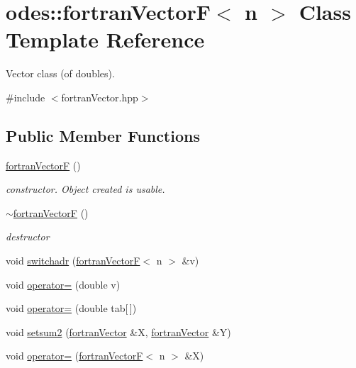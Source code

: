\hypertarget{classodes_1_1fortranVectorF}{\section{odes\-:\-:fortran\-Vector\-F$<$ n $>$ Class Template Reference}
\label{classodes_1_1fortranVectorF}
}


Vector class (of doubles).  




{\ttfamily \#include $<$fortran\-Vector.\-hpp$>$}

\subsection*{Public Member Functions}
\begin{DoxyCompactItemize}
\item 
\hyperlink{classodes_1_1fortranVectorF_a446528db3c1fe4b61dcfac9402b8c619}{fortran\-Vector\-F} ()
\begin{DoxyCompactList}\small\item\em constructor. Object created is usable. \end{DoxyCompactList}\item 
\hyperlink{classodes_1_1fortranVectorF_a668d0dbea090a6298c165092b27502ed}{$\sim$fortran\-Vector\-F} ()
\begin{DoxyCompactList}\small\item\em destructor \end{DoxyCompactList}\item 
void \hyperlink{classodes_1_1fortranVectorF_a88c726b6b22cdf20f81b345c89a51b95}{switchadr} (\hyperlink{classodes_1_1fortranVectorF}{fortran\-Vector\-F}$<$ n $>$ \&v)
\item 
void \hyperlink{classodes_1_1fortranVectorF_afeffa2b15976ed45e30a02af9afd1b58}{operator=} (double v)
\item 
void \hyperlink{classodes_1_1fortranVectorF_ae03bfc204b53e79814d762d43ee569fa}{operator=} (double tab\mbox{[}$\,$\mbox{]})
\item 
void \hyperlink{classodes_1_1fortranVectorF_a378e1167cdb871723f9a0ce254671a97}{setsum2} (\hyperlink{classodes_1_1fortranVector}{fortran\-Vector} \&X, \hyperlink{classodes_1_1fortranVector}{fortran\-Vector} \&Y)
\item 
void \hyperlink{classodes_1_1fortranVectorF_a222a619a78c85e3f9b977e7dc0d140c3}{operator=} (\hyperlink{classodes_1_1fortranVectorF}{fortran\-Vector\-F}$<$ n $>$ \&X)

\end{DoxyCompactItemize}

